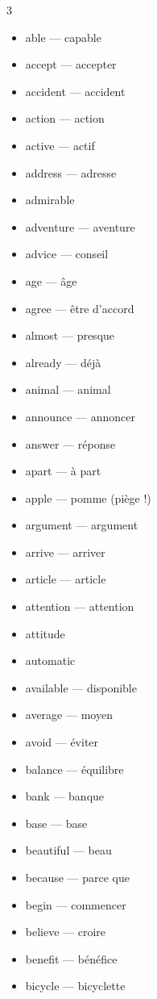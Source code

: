 \begin{tableau}
\footnotesize
\begin{multicols}{3}
\begin{anglais}
\begin{itemize}\setlength{\itemsep}{1pt}
\item able --- capable
\item accept --- accepter
\item accident --- accident
\item action --- action
\item active --- actif
\item address --- adresse
\item admirable
\item adventure --- aventure
\item advice --- conseil
\item age --- âge
\item agree --- être d'accord
\item almost --- presque
\item already --- déjà
\item animal --- animal
\item announce --- annoncer
\item answer --- réponse
\item apart --- à part
\item apple --- pomme (piège !)
\item argument --- argument
\item arrive --- arriver
\item article --- article
\item attention --- attention
\item attitude
\item automatic
\item available --- disponible
\item average --- moyen
\item avoid --- éviter
\item balance --- équilibre
\item bank --- banque
\item base --- base
\item beautiful --- beau
\item because --- parce que
\item begin --- commencer
\item believe --- croire
\item benefit --- bénéfice
\item bicycle --- bicyclette

\end{itemize}
\end{anglais}
\end{multicols}
\end{tableau}
